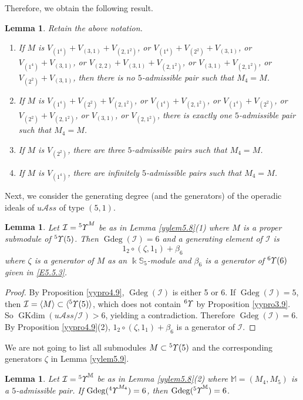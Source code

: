 \documentclass{amsart}
\newtheorem{lem}[thm]{Lemma}
\theoremstyle{definition}
\theoremstyle{remark}
\numberwithin{equation}{section}
\def\S{\mathbb{S}}
\def\gd{\operatorname{Gdeg}}
\newcommand{\lr}[1]{\langle #1 \rangle}
\newcommand{\up}[1]{{^{#1}{\it \!\Upsilon}}}
\newcommand{\upa}[1]{{^{#1}{\it \!\Upsilon}}}
\def \uas{u\mathcal{A}ss}
\def \I{\mathcal{I}}
\def\gkdim{\operatorname{GKdim}}
\def \S{\mathbb{S}}
\begin{document}
Therefore, we obtain the following result. 
\begin{lem}
\label{yylem5.10}
Retain the above notation.
\begin{enumerate}
\item[(1)]
If $M$ is $V_{(1^4)}+V_{(3,1)}+V_{(2,1^2)}$, or 
$V_{(1^4)}+V_{(2^2)}+V_{(3,1)}$, or $V_{(1^4)}+V_{(3,1)}$, 
or $V_{(2,2)}+V_{(3,1)}+V_{(2,1^2)}$, 
or $V_{(3,1)}+V_{(2,1^2)}$, or $V_{(2^2)}+V_{(3,1)}$, 
then there is no $5$-admissible pair such that $M_4=M$.
\item[(2)]
If $M$ is  $V_{(1^4)}+V_{(2^2)}+V_{(2,1^2)}$, or 
$V_{(1^4)}+V_{(2,1^2)}$, or $V_{(1^4)}+V_{(2^2)}$, 
or $V_{(2^2)}+V_{(2,1^2)}$, or $V_{(3,1)}$, or 
$V_{(2,1^2)}$, there is exactly one $5$-admissible 
pair such that $M_4=M$.	
\item[(3)]
If $M$ is  $V_{(2^2)}$,  there are  three $5$-admissible 
pairs such that $M_4=M$.
\item[(4)]
If $M$ is  $V_{(1^4)}$,  there are infinitely  $5$-admissible 
pairs such that $M_4=M$.	
\end{enumerate} 		
\end{lem}


Next, we consider the generating degree (and the generators) 
of the operadic ideals of $\uas$ of type $(5, 1)$.


\begin{lem}
\label{yylem5.11}
Let $\I=\up{5}^{M}$ be as in Lemma {\rm{\ref{yylem5.8}(1)}} 
where $M$ is a proper submodule of $\up{5}(5)$. Then 
$\gd(\I)=6$ and a generating element of $\I$ is
$$1_2\circ(\zeta, 1_1)+\beta_6$$
where $\zeta$ is a generator of $M$ as an $\Bbbk \S_5$-module 
and $\beta_6$ is a generator of $\up{6}(6)$ given in 
\eqref{E5.5.3}. 
\end{lem}

\begin{proof}
By Proposition \ref{yypro4.9}, $\gd(\I)$ is either 5 or 6. 
If $\gd(\I)=5$, then $\I=\lr{M}\subset \lr{\up{5}(5)}$,
which does not contain $\up{6}$ by Proposition 
\ref{yypro3.9}.
So $\gkdim (\uas/\I)>6$, yielding a contradiction. Therefore 
$\gd(\I)=6$. By Proposition \ref{yypro4.9}(2), 
$1_2\circ(\zeta, 1_1)+\beta_6$ is a generator of $\I$.
\end{proof}

We are not going to list all submodules $M\subset \up{5}(5)$ and 
the corresponding generators $\zeta$ in Lemma \ref{yylem5.9}.


\begin{lem}
\label{yylem5.12}
Let $\I=\upa{5}^{\mathbb M}$ be as in Lemma 
{\rm{\ref{yylem5.8}(2)}} where ${\mathbb M}=(M_4,M_5)$ is 
a $5$-admissible pair.  If $\gd(\up{4}^{M_4})=6$, then 
$\gd(\upa{5}^{\mathbb M})=6$.
\end{lem}
\end{document}
